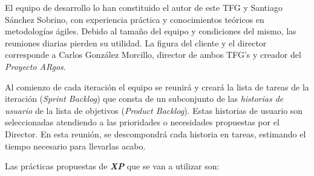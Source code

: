 El  equipo  de  desarrollo  lo  han constituido el autor de este TFG y Santiago Sánchez Sobrino, con  experiencia  práctica y conocimientos teóricos en metodologías ágiles. Debido  al  tamaño  del  equipo  y  condiciones  del  mismo,  las  reuniones  diarias pierden su utilidad. La figura del cliente y el director corresponde a Carlos González Morcillo, director de ambos TFG's y creador del \textit{Proyecto ARgos}. 

Al comienzo de cada iteración el equipo se reunirá y creará la lista de tareas de la iteración (\textit{Sprint Backlog}) que consta de un subconjunto de las \textit{historias de usuario} de la lista de objetivos (\textit{Product Backlog}). Estas historias de usuario son seleccionadas atendiendo a las prioridades o necesidades propuestas por el Director. En esta reunión, se descompondrá cada historia en tareas, estimando el tiempo necesario para llevarlas acabo. 

Las prácticas propuestas de \textbf{\textit{XP}} que se van a utilizar son: 

